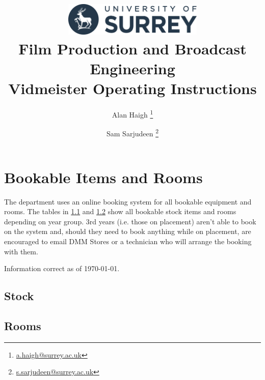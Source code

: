 \documentclass{report}
\title{
\includegraphics[width=0.5\textwidth]{uos-logo.png}\\\vspace{1cm}
Film Production and Broadcast Engineering\\Vidmeister Operating Instructions
}
\author{Alan Haigh \thanks{\href{mailto:a.haigh@surrey.ac.uk}{a.haigh@surrey.ac.uk}} \and Sam Sarjudeen \thanks{\href{mailto:s.sarjudeen@surrey.ac.uk}{s.sarjudeen@surrey.ac.uk}}}
\begin{document}
\maketitle
\tableofcontents

\chapter{Bookable Items and Rooms}

The department uses an online booking system for all bookable equipment and rooms. The tables in \ref{stock} and \ref{rooms} show all bookable stock items and rooms depending on year group. 3rd years (i.e. those on placement) aren't able to book on the system and, should they need to book anything while on placement, are encouraged to email DMM Stores or a technician who will arrange the booking with them.

Information correct as of \today.

\section{Stock}\label{stock}



\newpage
\section{Rooms}\label{rooms}



\end{document}
